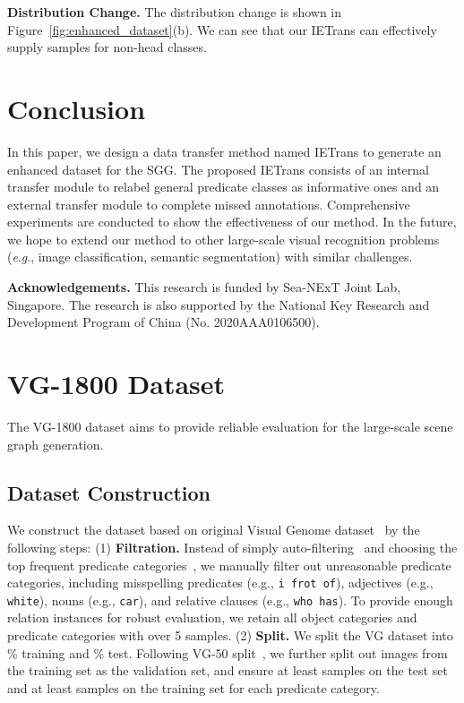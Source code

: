 \documentclass[runningheads]{llncs}
\newcommand{\eg}{\textit{e}.\textit{g}.}
\begin{document}
\smallskip
\noindent
\textbf{Distribution Change.}
The distribution change is shown in Figure~\ref{fig:enhanced_dataset}(b).
We can see that our IETrans can effectively supply samples for non-head classes.





\section{Conclusion}
In this paper, we design a data transfer method named IETrans to generate an enhanced dataset for the SGG. 
The proposed IETrans consists of an internal transfer module to relabel general predicate classes as informative ones and an external transfer module to complete missed annotations.
Comprehensive experiments are conducted to show the effectiveness of our method.
In the future, we hope to extend our method to other large-scale visual recognition problems (\eg, image classification, semantic segmentation) with similar challenges.



\bigskip
\noindent
\textbf{Acknowledgements.}
This research is funded by Sea-NExT Joint Lab, Singapore. The research is also supported by the National Key Research and Development Program of China (No. 2020AAA0106500).




\clearpage

\appendix

\section{VG-1800 Dataset}
The VG-1800 dataset aims to provide reliable evaluation for the large-scale scene graph generation.

\subsection{Dataset Construction}
We construct the dataset based on original Visual Genome dataset~\cite{krishna2017visual} by the following steps: (1) \textbf{Filtration.} Instead of simply auto-filtering~\cite{zhang2019large} and choosing the top frequent predicate categories~\cite{abdelkarim2020long}, we manually filter out unreasonable predicate categories, including misspelling predicates (e.g., \texttt{i frot of}), adjectives (e.g., \texttt{white}), nouns (e.g., \texttt{car}), and relative clauses (e.g., \texttt{who has}).
To provide enough relation instances for robust evaluation, we retain all object categories and predicate categories with over 5 samples.
(2) \textbf{Split.} 
We split the VG dataset into \% training and \% test.
Following VG-50 split~\cite{xu2017scene}, we further split out  images from the training set as the validation set, and ensure at least  samples on the test set and at least  samples on the training set for each predicate category.
\end{document}
